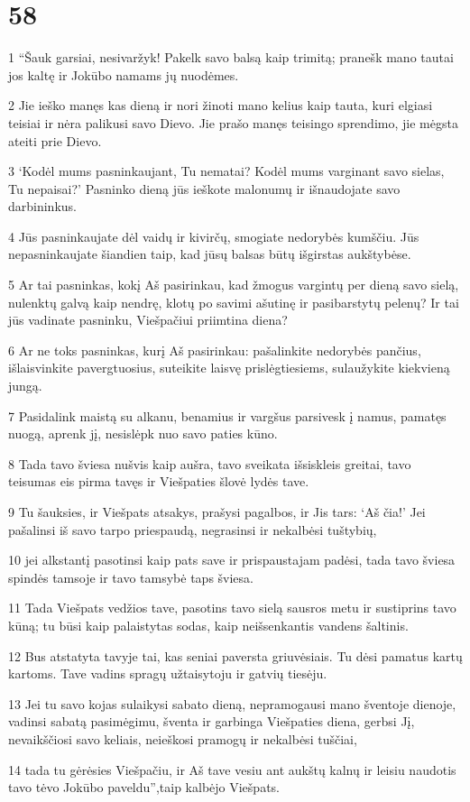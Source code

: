 \chapter{58}


\par 1 “Šauk garsiai, nesivaržyk! Pakelk savo balsą kaip trimitą; pranešk mano tautai jos kaltę ir Jokūbo namams jų nuodėmes. 
\par 2 Jie ieško manęs kas dieną ir nori žinoti mano kelius kaip tauta, kuri elgiasi teisiai ir nėra palikusi savo Dievo. Jie prašo manęs teisingo sprendimo, jie mėgsta ateiti prie Dievo. 
\par 3 ‘Kodėl mums pasninkaujant, Tu nematai? Kodėl mums varginant savo sielas, Tu nepaisai?’ Pasninko dieną jūs ieškote malonumų ir išnaudojate savo darbininkus. 
\par 4 Jūs pasninkaujate dėl vaidų ir kivirčų, smogiate nedorybės kumščiu. Jūs nepasninkaujate šiandien taip, kad jūsų balsas būtų išgirstas aukštybėse. 
\par 5 Ar tai pasninkas, kokį Aš pasirinkau, kad žmogus vargintų per dieną savo sielą, nulenktų galvą kaip nendrę, klotų po savimi ašutinę ir pasibarstytų pelenų? Ir tai jūs vadinate pasninku, Viešpačiui priimtina diena? 
\par 6 Ar ne toks pasninkas, kurį Aš pasirinkau: pašalinkite nedorybės pančius, išlaisvinkite pavergtuosius, suteikite laisvę prislėgtiesiems, sulaužykite kiekvieną jungą. 
\par 7 Pasidalink maistą su alkanu, benamius ir vargšus parsivesk į namus, pamatęs nuogą, aprenk jį, nesislėpk nuo savo paties kūno. 
\par 8 Tada tavo šviesa nušvis kaip aušra, tavo sveikata išsiskleis greitai, tavo teisumas eis pirma tavęs ir Viešpaties šlovė lydės tave. 
\par 9 Tu šauksies, ir Viešpats atsakys, prašysi pagalbos, ir Jis tars: ‘Aš čia!’ Jei pašalinsi iš savo tarpo priespaudą, negrasinsi ir nekalbėsi tuštybių, 
\par 10 jei alkstantį pasotinsi kaip pats save ir prispaustajam padėsi, tada tavo šviesa spindės tamsoje ir tavo tamsybė taps šviesa. 
\par 11 Tada Viešpats vedžios tave, pasotins tavo sielą sausros metu ir sustiprins tavo kūną; tu būsi kaip palaistytas sodas, kaip neišsenkantis vandens šaltinis. 
\par 12 Bus atstatyta tavyje tai, kas seniai paversta griuvėsiais. Tu dėsi pamatus kartų kartoms. Tave vadins spragų užtaisytoju ir gatvių tiesėju. 
\par 13 Jei tu savo kojas sulaikysi sabato dieną, nepramogausi mano šventoje dienoje, vadinsi sabatą pasimėgimu, šventa ir garbinga Viešpaties diena, gerbsi Jį, nevaikščiosi savo keliais, neieškosi pramogų ir nekalbėsi tuščiai, 
\par 14 tada tu gėrėsies Viešpačiu, ir Aš tave vesiu ant aukštų kalnų ir leisiu naudotis tavo tėvo Jokūbo paveldu”,­taip kalbėjo Viešpats.



